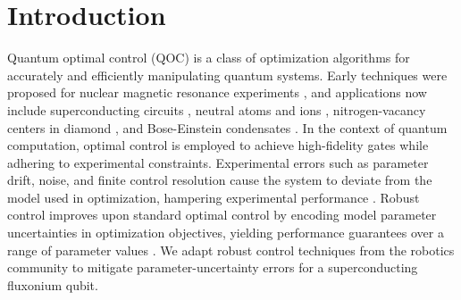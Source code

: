 \documentclass[
  amsfonts,
  amsmath,
  amssymb,
  pra,
  twocolumn,
  superscriptaddress,
]{revtex4-2}
\begin{document}
\maketitle

\section{Introduction}
Quantum optimal control (QOC) is a class of optimization
algorithms for accurately and efficiently manipulating quantum systems.
Early techniques were proposed for nuclear magnetic resonance experiments
\cite{vandersypen2005nmr, kehlet2004improving, khaneja2005optimal,
  maximov2008optimal, nielsen2010optimal, skinner2003application, tosner2009optimal},
and applications now include superconducting circuits \cite{abdelhafez2020universal,
  chakram2020multimode, egger2013optimized, fisher2010optimal, gokhale2019partial,
  huang2014optimal, heeres2017implementing, kelly2014optimal, leng2019robust,
  leung2017speedup, li2020fast,
  liebermann2016optimal, reinhold2019controlling,
  rebentrost2009optimal, rebentrost2009optimal2, spiteri2018quantum,
  sporl2007optimal},
neutral atoms and ions \cite{brouzos2015quantum,
  de2008optimal, grace2007optimal, goerz2011quantum, guo2019high, jensen2019time,
  larrouy2020fast, nebendahl2009optimal, omran2019generation,
  rosi2013fast,
  treutlein2006microwave, van2016optimal},
nitrogen-vacancy centers in diamond \cite{chou2015optimal,
  dolde2014high, geng2016experimental,
  nobauer2015smooth, poggiali2018optimal, rembold2020introduction, tian2019optimal},
and Bose-Einstein condensates \cite{amri2019optimal, doria2011optimal,
  sorensen2019qengine, sorensen2018quantum}.
In the context of quantum computation,
optimal control is employed to achieve high-fidelity gates
while adhering to experimental constraints.
Experimental errors such as parameter drift, noise, and
finite control resolution cause the system to deviate
from the model used in optimization, hampering
experimental performance
\cite{chakram2020multimode, heeres2017implementing, klimov2020snake,
  omran2019generation, reinhold2019controlling}.
Robust control improves upon
standard optimal control by encoding
model parameter uncertainties
in optimization objectives, yielding performance
guarantees over a range of parameter values \cite{Zhou97,Morimoto00,Manchester18}.
We adapt robust control techniques from the robotics community to mitigate
parameter-uncertainty errors for
a superconducting fluxonium qubit.
\end{document}
